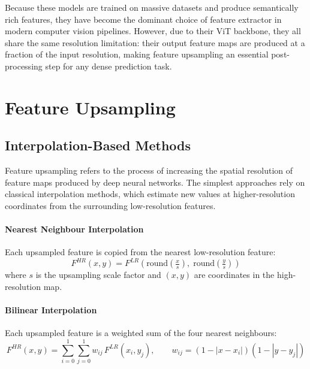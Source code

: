 Because these models are trained on massive datasets and produce
semantically rich features, they have become the dominant choice
of feature extractor in modern computer vision pipelines.
However, due to their ViT backbone, they all share the same
resolution limitation: their output feature maps are produced at
a fraction of the input resolution, making feature upsampling
an essential post-processing step for any dense prediction task.

\section{Feature Upsampling}

\subsection{Interpolation-Based Methods}

Feature upsampling refers to the process of increasing the
spatial resolution of feature maps produced by deep neural
networks.
The simplest approaches rely on classical interpolation
methods, which estimate new values at higher-resolution
coordinates from the surrounding low-resolution features.

\paragraph{Nearest Neighbour Interpolation}
Each upsampled feature is copied from the nearest
low-resolution feature:
\begin{equation}
  F^{HR}(x, y)
  = F^{LR}\!\left(
      \text{round}\!\left(\tfrac{x}{s}\right),\;
      \text{round}\!\left(\tfrac{y}{s}\right)
    \right)
\end{equation}
where $s$ is the upsampling scale factor and $(x, y)$ are
coordinates in the high-resolution map.

\paragraph{Bilinear Interpolation}
Each upsampled feature is a weighted sum of the four nearest
neighbours:
\begin{equation}
  F^{HR}(x, y)
  = \sum_{i=0}^{1} \sum_{j=0}^{1}
    w_{ij}\, F^{LR}(x_i, y_j),
  \qquad
  w_{ij} = (1 - |x - x_i|)(1 - |y - y_j|)
\end{equation}

